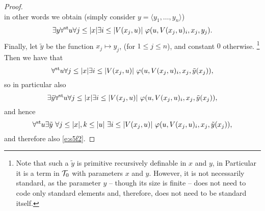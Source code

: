 \begin{proof}
\[\]
in other words we obtain (simply consider $y=\langle y_1,\ldots,y_n \rangle$)
\[
\exists y \forall^{\operatorname{st}{}}\! u \forall j\leq |x| \exists i\leq |V(x_j,u)|\ \varphi(u,V(x_j,u)_i,x_j,y_j).
\]
Finally, let $\tilde y$ be the function $x_j\mapsto y_j$, (for $1\leq j\leq n$), and constant $0$ otherwise.
\footnote{Note that such a $\tilde y$ is primitive recursively definable in $x$ and $y$, in Particular it is a term in $\mathcal{T}_0$ with parameters $x$ and $y$. However, it is not necessarily standard, as the parameter $y$ -- though its size is finite -- does not need to code only standard elements and, therefore, does not need to be standard itself.}
Then we have that
\[
\forall^{\operatorname{st}{}}\! u \forall j\leq |x| \exists i\leq |V(x_j,u)|\ \varphi(u,V(x_j,u)_i,x_j,\tilde y(x_j)),
\]
so in particular also
\[
\exists \tilde y\forall^{\operatorname{st}{}}\! u \forall j\leq |x| \exists i\leq |V(x_j,u)|\ \varphi(u,V(x_j,u)_i,x_j,\tilde y(x_j)),
\]
and hence
\[
\forall^{\operatorname{st}{}}\! u\exists \tilde y\ \forall j\leq |x|,k\leq |u|\  \exists i\leq |V(x_j,u)|\ \varphi(u,V(x_j,u)_i,x_j,\tilde y(x_j)),
\]
and therefore also \eqref{e:s5f2}.
\end{proof}